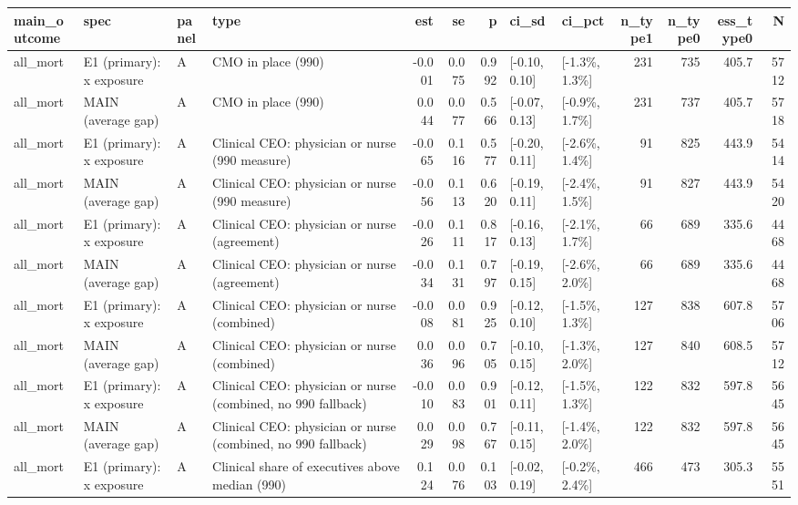 
\begin{tabular}{llllrrrllrrrr}
\toprule
main\_outcome & spec & panel & type & est & se & p & ci\_sd & ci\_pct & n\_type1 & n\_type0 & ess\_type0 & N\\
\midrule
all\_mort & E1 (primary): x exposure & A & CMO in place (990) & -0.001 & 0.075 & 0.992 & {}[-0.10, 0.10] & {}[-1.3\%, 1.3\%] & 231 & 735 & 405.7 & 5712\\
all\_mort & MAIN (average gap) & A & CMO in place (990) & 0.044 & 0.077 & 0.566 & {}[-0.07, 0.13] & {}[-0.9\%, 1.7\%] & 231 & 737 & 405.7 & 5718\\
all\_mort & E1 (primary): x exposure & A & Clinical CEO: physician or nurse (990 measure) & -0.065 & 0.116 & 0.577 & {}[-0.20, 0.11] & {}[-2.6\%, 1.4\%] & 91 & 825 & 443.9 & 5414\\
all\_mort & MAIN (average gap) & A & Clinical CEO: physician or nurse (990 measure) & -0.056 & 0.113 & 0.620 & {}[-0.19, 0.11] & {}[-2.4\%, 1.5\%] & 91 & 827 & 443.9 & 5420\\
all\_mort & E1 (primary): x exposure & A & Clinical CEO: physician or nurse (agreement) & -0.026 & 0.111 & 0.817 & {}[-0.16, 0.13] & {}[-2.1\%, 1.7\%] & 66 & 689 & 335.6 & 4468\\
\addlinespace
all\_mort & MAIN (average gap) & A & Clinical CEO: physician or nurse (agreement) & -0.034 & 0.131 & 0.797 & {}[-0.19, 0.15] & {}[-2.6\%, 2.0\%] & 66 & 689 & 335.6 & 4468\\
all\_mort & E1 (primary): x exposure & A & Clinical CEO: physician or nurse (combined) & -0.008 & 0.081 & 0.925 & {}[-0.12, 0.10] & {}[-1.5\%, 1.3\%] & 127 & 838 & 607.8 & 5706\\
all\_mort & MAIN (average gap) & A & Clinical CEO: physician or nurse (combined) & 0.036 & 0.096 & 0.705 & {}[-0.10, 0.15] & {}[-1.3\%, 2.0\%] & 127 & 840 & 608.5 & 5712\\
all\_mort & E1 (primary): x exposure & A & Clinical CEO: physician or nurse (combined, no 990 fallback) & -0.010 & 0.083 & 0.901 & {}[-0.12, 0.11] & {}[-1.5\%, 1.3\%] & 122 & 832 & 597.8 & 5645\\
all\_mort & MAIN (average gap) & A & Clinical CEO: physician or nurse (combined, no 990 fallback) & 0.029 & 0.098 & 0.767 & {}[-0.11, 0.15] & {}[-1.4\%, 2.0\%] & 122 & 832 & 597.8 & 5645\\
\addlinespace
all\_mort & E1 (primary): x exposure & A & Clinical share of executives above median (990) & 0.124 & 0.076 & 0.103 & {}[-0.02, 0.19] & {}[-0.2\%, 2.4\%] & 466 & 473 & 305.3 & 5551\\

\end{tabular}
